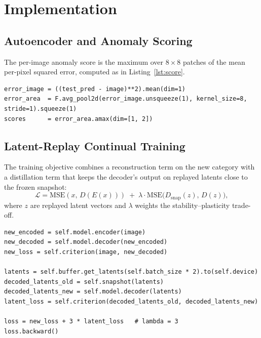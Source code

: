 \documentclass[11pt]{article}
\begin{document}
\section{Implementation}
\label{sec:impl}

\subsection{Autoencoder and Anomaly Scoring}
%
The per-image anomaly score is the maximum over $8\times8$ patches of the mean
per-pixel squared error, computed as in Listing~\ref{lst:score}.

\begin{lstlisting}[caption={Patch-max anomaly score in the test loop.},label={lst:score}]
error_image = ((test_pred - image)**2).mean(dim=1)
error_area  = F.avg_pool2d(error_image.unsqueeze(1), kernel_size=8, stride=1).squeeze(1)
scores      = error_area.amax(dim=[1, 2])
\end{lstlisting}

\subsection{Latent-Replay Continual Training}
The training objective combines a reconstruction term on the new category with a
distillation term that keeps the decoder's output on replayed latents close to the
frozen snapshot:
\begin{equation}
\mathcal{L} = \mathrm{MSE}(x,\, D(E(x))) \;+\; \lambda \cdot
\mathrm{MSE}\big(D_{\mathrm{snap}}(z),\, D(z)\big),
\end{equation}
where $z$ are replayed latent vectors and $\lambda$ weights the
stability--plasticity trade-off.

\begin{lstlisting}[caption={Core of the latent-replay training step.},label={lst:replay}]
new_encoded = self.model.encoder(image)
new_decoded = self.model.decoder(new_encoded)
new_loss = self.criterion(image, new_decoded)

latents = self.buffer.get_latents(self.batch_size * 2).to(self.device)
decoded_latents_old = self.snapshot(latents)
decoded_latents_new = self.model.decoder(latents)
latent_loss = self.criterion(decoded_latents_old, decoded_latents_new)

loss = new_loss + 3 * latent_loss   # lambda = 3
loss.backward()
\end{lstlisting}
\end{document}
